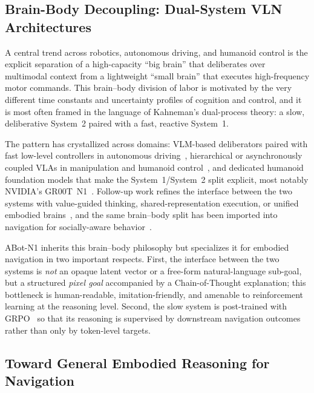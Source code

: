 \subsection{Brain-Body Decoupling: Dual-System VLN Architectures}
\label{sec:rw-dualsystem}

A central trend across robotics, autonomous driving, and humanoid control
is the explicit separation of a high-capacity ``big brain'' that
deliberates over multimodal context from a lightweight ``small brain''
that executes high-frequency motor commands. This brain--body division
of labor is motivated by the very different time constants and
uncertainty profiles of cognition and control, and it is most often
framed in the language of Kahneman's dual-process theory: a slow,
deliberative System~2 paired with a fast, reactive System~1.

The pattern has crystallized across domains: VLM-based deliberators paired
with fast low-level controllers in autonomous
driving~\cite{wen2024drivevlm}, hierarchical or asynchronously coupled
VLAs in manipulation and humanoid
control~\cite{shi2025hi,figureai2025helix,physicalintelligence2024pi05},
and dedicated humanoid foundation models that make the System~1/System~2
split explicit, most notably NVIDIA's GR00T~N1~\cite{nvidia2025groot}.
Follow-up work refines the interface between the two systems with
value-guided thinking, shared-representation execution, or unified
embodied brains~\cite{song2025hume,chen2025fastinslow,baai2025robobrain2},
and the same brain--body split has been imported into navigation for
socially-aware behavior~\cite{chen2025socialnav}.

ABot-N1 inherits this brain--body philosophy but specializes it for
embodied navigation in two important respects. First, the interface
between the two systems is \emph{not} an opaque latent vector or a free-form
natural-language sub-goal, but a structured \emph{pixel goal} accompanied
by a Chain-of-Thought explanation; this bottleneck is human-readable,
imitation-friendly, and amenable to reinforcement learning at the
reasoning level. Second, the slow system is post-trained with
GRPO~\cite{deepseekai2025r1} so that its reasoning is supervised by
downstream navigation outcomes rather than only by token-level targets.

\subsection{Toward General Embodied Reasoning for Navigation}
\label{sec:rw-reasoning}

